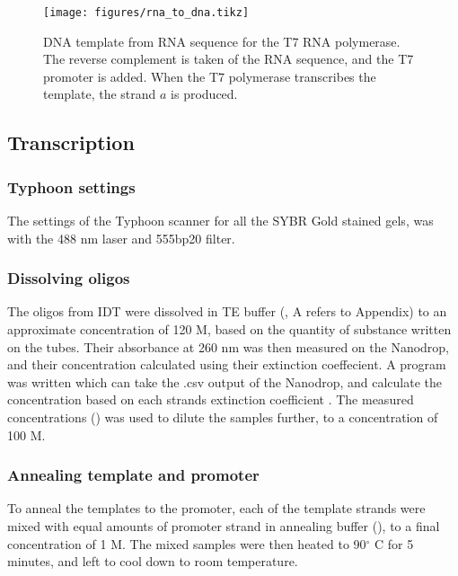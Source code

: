 
\begin{figure}[h]
\centering
\texttt{[image: figures/rna\_to\_dna.tikz]}
\caption{DNA template from RNA sequence for the T7 RNA polymerase. The reverse complement is taken of the RNA sequence, and the T7 promoter is added. When the T7 polymerase transcribes the template, the strand $a$ is produced.}
\label{rna_to_dna_process}
\end{figure}

\subsection{Transcription}

\subsubsection{Typhoon settings}
The settings of the Typhoon scanner for all the SYBR Gold stained gels, was with the 488 nm laser and 555bp20 filter.

\subsubsection{Dissolving oligos}

The oligos from IDT were dissolved in TE buffer (, A refers to Appendix) to an approximate concentration of 120 \si{\micro}M, based on the quantity of substance written on the tubes. Their absorbance at 260 nm was then measured on the Nanodrop, and their concentration calculated using their extinction coeffecient. A program was written which can take the .csv output of the Nanodrop, and calculate the concentration based on each strands extinction coefficient \cite{nanodropimport}. The measured concentrations () was used to dilute the samples further, to a concentration of 100 \si{\micro}M.

\subsubsection{Annealing template and promoter}

To anneal the templates to the promoter, each of the template strands were mixed with equal amounts of promoter strand in annealing buffer (), to a final concentration of 1 \si{\micro}M. The mixed samples were then heated to 90$^\circ$ C for 5 minutes, and left to cool down to room temperature.

